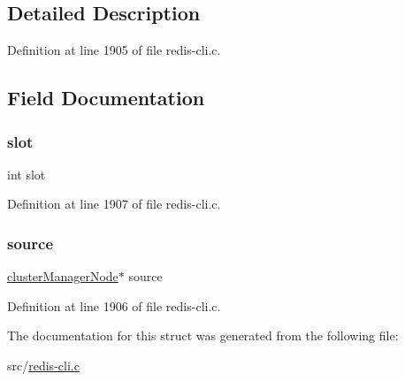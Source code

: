 \subsection{Detailed Description}


Definition at line 1905 of file redis-\/cli.\+c.



\subsection{Field Documentation}
\mbox{\label{structcluster_manager_reshard_table_item_a83d6e2127b4cc5e01f2012608487d31a}} 
\subsubsection{\texorpdfstring{slot}{slot}}
{\footnotesize\ttfamily int slot}



Definition at line 1907 of file redis-\/cli.\+c.

\mbox{\label{structcluster_manager_reshard_table_item_a081134bbad31a2e5f1ab9796878c9046}} 
\subsubsection{\texorpdfstring{source}{source}}
{\footnotesize\ttfamily \hyperlink{structcluster_manager_node}{cluster\+Manager\+Node}$\ast$ source}



Definition at line 1906 of file redis-\/cli.\+c.



The documentation for this struct was generated from the following file\+:\begin{DoxyCompactItemize}
\item 
src/\hyperlink{redis-cli_8c}{redis-\/cli.\+c}\end{DoxyCompactItemize}
